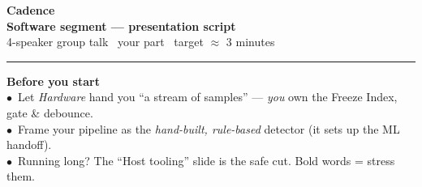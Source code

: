 \documentclass[12pt]{article}
\begin{document}
{\sffamily
 {\color{navy}\Huge\bfseries Cadence}\\[3pt]
 {\color{brick}\large\bfseries Software segment --- presentation script}\\[5pt]
 {\color{muted}\normalsize 4-speaker group talk \textbullet\ your part \textbullet\ target $\approx$ 3 minutes}\par}
\vspace{5pt}
{\color{navy}\rule{\linewidth}{1.2pt}}

\vspace{7pt}
\noindent\colorbox{tint}{%
\begin{minipage}{\dimexpr\linewidth-2\fboxsep}
\sffamily\small\color{navy}\setlength{\parskip}{2pt}
\textbf{Before you start}\\
$\bullet$\ Let \emph{Hardware} hand you ``a stream of samples'' --- \emph{you} own the Freeze Index, gate \& debounce.\\
$\bullet$\ Frame your pipeline as the \emph{hand-built, rule-based} detector (it sets up the ML handoff).\\
$\bullet$\ Running long? The ``Host tooling'' slide is the safe cut. \quad Bold words = stress them.
\end{minipage}}
\vspace{4pt}
\end{document}
